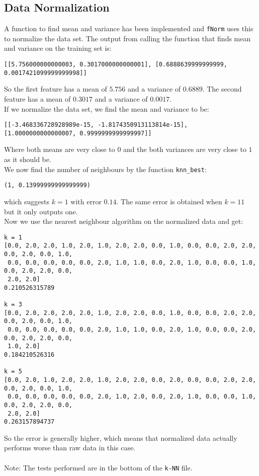 \documentclass[a4paper]{article}
\begin{document}
\subsection{Data Normalization}
A function to find mean and variance has been implemented and \texttt{fNorm} uses this to normalize the data set. The output from calling the function that finds mean and variance on the training set is:
\begin{verbatim}
[[5.756000000000003, 0.3017000000000001], [0.6888639999999999, 0.0017421099999999998]]
\end{verbatim}
So the first feature has a mean of $5.756$ and a variance of $0.6889$. The second feature has a mean of $0.3017$ and a variance of $0.0017$. \\
If we normalize the data set, we find the mean and variance to be:
\begin{verbatim}
[[-3.468336728928989e-15, -1.8174350913113814e-15], [1.0000000000000007, 0.9999999999999997]]
\end{verbatim}
Where both means are very close to $0$ and the both variances are very close to $1$ as it should be. \\
We now find the number of neighbours by the function \texttt{knn\_best}:
\begin{verbatim}
(1, 0.13999999999999999)
\end{verbatim}
which suggests $k=1$ with error $0.14$. The same error is obtained when $k=11$ but it only outputs one. \\
Now we use the nearest neighbour algorithm on the normalized data and get:
\begin{verbatim}
k = 1
[0.0, 2.0, 2.0, 1.0, 2.0, 1.0, 2.0, 2.0, 0.0, 1.0, 0.0, 0.0, 2.0, 2.0, 0.0, 2.0, 0.0, 1.0,
 0.0, 0.0, 0.0, 0.0, 0.0, 2.0, 1.0, 1.0, 0.0, 2.0, 1.0, 0.0, 0.0, 1.0, 0.0, 2.0, 2.0, 0.0,
 2.0, 2.0]
0.210526315789

k = 3
[0.0, 2.0, 2.0, 2.0, 2.0, 1.0, 2.0, 2.0, 0.0, 1.0, 0.0, 0.0, 2.0, 2.0, 0.0, 2.0, 0.0, 1.0,
 0.0, 0.0, 0.0, 0.0, 0.0, 2.0, 1.0, 1.0, 0.0, 2.0, 1.0, 0.0, 0.0, 2.0, 0.0, 2.0, 2.0, 0.0,
 1.0, 2.0]
0.184210526316

k = 5
[0.0, 2.0, 1.0, 2.0, 2.0, 1.0, 2.0, 2.0, 0.0, 2.0, 0.0, 0.0, 2.0, 2.0, 0.0, 2.0, 0.0, 1.0,
 0.0, 0.0, 0.0, 0.0, 0.0, 2.0, 1.0, 2.0, 0.0, 2.0, 1.0, 0.0, 0.0, 1.0, 0.0, 2.0, 2.0, 0.0,
 2.0, 2.0]
0.263157894737

\end{verbatim}
So the error is generally higher, which means that normalized data actually performs worse than raw data in this case. \\
\\
Note: The tests performed are in the bottom of the \texttt{k-NN} file.
\end{document}
